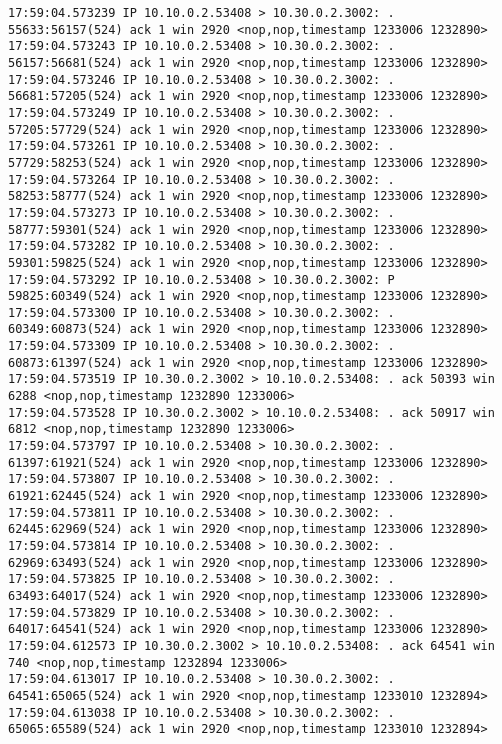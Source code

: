 \documentclass[a4paper,12pt]{article}
\begin{document}
\begin{Verbatim}
17:59:04.573239 IP 10.10.0.2.53408 > 10.30.0.2.3002: . 55633:56157(524) ack 1 win 2920 <nop,nop,timestamp 1233006 1232890>
17:59:04.573243 IP 10.10.0.2.53408 > 10.30.0.2.3002: . 56157:56681(524) ack 1 win 2920 <nop,nop,timestamp 1233006 1232890>
17:59:04.573246 IP 10.10.0.2.53408 > 10.30.0.2.3002: . 56681:57205(524) ack 1 win 2920 <nop,nop,timestamp 1233006 1232890>
17:59:04.573249 IP 10.10.0.2.53408 > 10.30.0.2.3002: . 57205:57729(524) ack 1 win 2920 <nop,nop,timestamp 1233006 1232890>
17:59:04.573261 IP 10.10.0.2.53408 > 10.30.0.2.3002: . 57729:58253(524) ack 1 win 2920 <nop,nop,timestamp 1233006 1232890>
17:59:04.573264 IP 10.10.0.2.53408 > 10.30.0.2.3002: . 58253:58777(524) ack 1 win 2920 <nop,nop,timestamp 1233006 1232890>
17:59:04.573273 IP 10.10.0.2.53408 > 10.30.0.2.3002: . 58777:59301(524) ack 1 win 2920 <nop,nop,timestamp 1233006 1232890>
17:59:04.573282 IP 10.10.0.2.53408 > 10.30.0.2.3002: . 59301:59825(524) ack 1 win 2920 <nop,nop,timestamp 1233006 1232890>
17:59:04.573292 IP 10.10.0.2.53408 > 10.30.0.2.3002: P 59825:60349(524) ack 1 win 2920 <nop,nop,timestamp 1233006 1232890>
17:59:04.573300 IP 10.10.0.2.53408 > 10.30.0.2.3002: . 60349:60873(524) ack 1 win 2920 <nop,nop,timestamp 1233006 1232890>
17:59:04.573309 IP 10.10.0.2.53408 > 10.30.0.2.3002: . 60873:61397(524) ack 1 win 2920 <nop,nop,timestamp 1233006 1232890>
17:59:04.573519 IP 10.30.0.2.3002 > 10.10.0.2.53408: . ack 50393 win 6288 <nop,nop,timestamp 1232890 1233006>
17:59:04.573528 IP 10.30.0.2.3002 > 10.10.0.2.53408: . ack 50917 win 6812 <nop,nop,timestamp 1232890 1233006>
17:59:04.573797 IP 10.10.0.2.53408 > 10.30.0.2.3002: . 61397:61921(524) ack 1 win 2920 <nop,nop,timestamp 1233006 1232890>
17:59:04.573807 IP 10.10.0.2.53408 > 10.30.0.2.3002: . 61921:62445(524) ack 1 win 2920 <nop,nop,timestamp 1233006 1232890>
17:59:04.573811 IP 10.10.0.2.53408 > 10.30.0.2.3002: . 62445:62969(524) ack 1 win 2920 <nop,nop,timestamp 1233006 1232890>
17:59:04.573814 IP 10.10.0.2.53408 > 10.30.0.2.3002: . 62969:63493(524) ack 1 win 2920 <nop,nop,timestamp 1233006 1232890>
17:59:04.573825 IP 10.10.0.2.53408 > 10.30.0.2.3002: . 63493:64017(524) ack 1 win 2920 <nop,nop,timestamp 1233006 1232890>
17:59:04.573829 IP 10.10.0.2.53408 > 10.30.0.2.3002: . 64017:64541(524) ack 1 win 2920 <nop,nop,timestamp 1233006 1232890>
17:59:04.612573 IP 10.30.0.2.3002 > 10.10.0.2.53408: . ack 64541 win 740 <nop,nop,timestamp 1232894 1233006>
17:59:04.613017 IP 10.10.0.2.53408 > 10.30.0.2.3002: . 64541:65065(524) ack 1 win 2920 <nop,nop,timestamp 1233010 1232894>
17:59:04.613038 IP 10.10.0.2.53408 > 10.30.0.2.3002: . 65065:65589(524) ack 1 win 2920 <nop,nop,timestamp 1233010 1232894>

\end{Verbatim}
\end{document}
